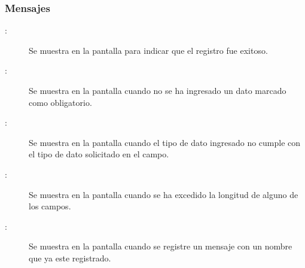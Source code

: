 \subsubsection{Mensajes}

	
\begin{description}
	\item[:] Se muestra en la pantalla  para indicar que el registro fue exitoso.
	\item[:] Se muestra en la pantalla  cuando no se ha ingresado un dato marcado como obligatorio.
	\item[:] Se muestra en la pantalla  cuando el tipo de dato ingresado no cumple con el tipo de dato solicitado en el campo.
	\item[:] Se muestra en la pantalla  cuando se ha excedido la longitud de alguno de los campos.
	\item[:] Se muestra en la pantalla  cuando se registre un mensaje con un nombre que ya este registrado.
\end{description}
